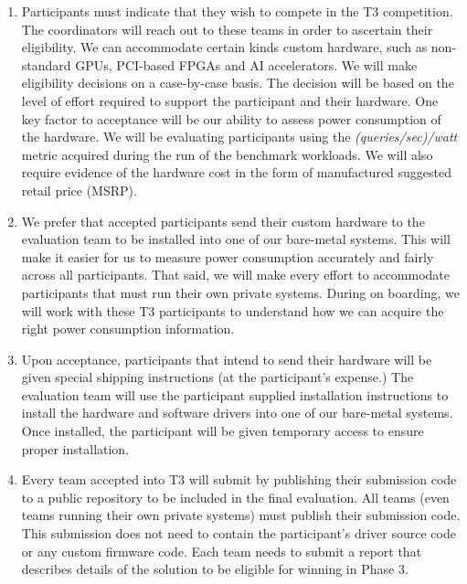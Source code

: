 \begin{enumerate}
  \item Participants must indicate that they wish to compete in the T3
    competition. The coordinators will reach out to these teams in
    order to ascertain their eligibility. We can accommodate certain
    kinds custom hardware, such as non-standard GPUs, PCI-based FPGAs
    and AI accelerators.  We will make eligibility decisions on a
    case-by-case basis. The decision will be based on the level of
    effort required to support the participant and their hardware. One
    key factor to acceptance will be our ability to assess power
    consumption of the hardware.  We will be evaluating participants
    using the \emph{(queries/sec)/watt} metric acquired during the run
    of the benchmark workloads. We will also require evidence of the
    hardware cost in the form of manufactured suggested retail price
    (MSRP).

  \item We prefer that accepted participants send their custom
    hardware to the evaluation team to be installed into one of our
    bare-metal systems. This will make it easier for us to measure
    power consumption accurately and fairly across all participants.
    That said, we will make every effort to accommodate participants
    that must run their own private systems.  During on boarding, we
    will work with these T3 participants to understand how we can
    acquire the right power consumption information.

  \item Upon acceptance, participants that intend to send their
    hardware will be given special shipping instructions (at the
    participant's expense.)  The evaluation team will use the
    participant supplied installation instructions to install the
    hardware and software drivers into one of our bare-metal systems.
    Once installed, the participant will be given temporary access to
    ensure proper installation.

  \item Every team accepted into T3 will submit by publishing their
    submission code to a public repository to be included in the final
    evaluation. All teams (even teams running their own private
    systems) must publish their submission code.  This submission does
    not need to contain the participant's driver source code or any
    custom firmware code.  Each team needs to submit a report that
    describes details of the solution to be eligible for winning in
    Phase 3.


\end{enumerate}
